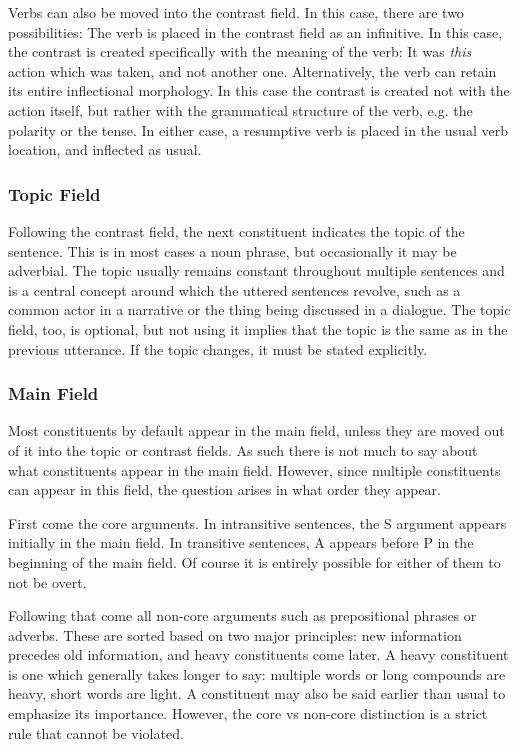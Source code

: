 \documentclass[paper=6in:9in, fontsize=10.5]{scrbook}
\newcommand{\mes}[1]{\hspace{0pt}{\color{teal}#1}}
\newcommand{\rs}{ȿ}
\newcommand{\rz}{ɀ}
\newcommand{\ý}{ɨ́}
\begin{document}
{Verbs can also be moved into the contrast field. In this case, there are two possibilities: The verb is placed in the contrast field as an infinitive. In this case, the contrast is created specifically with the meaning of the verb: It was \emph{this} action which was taken, and not another one. Alternatively, the verb can retain its entire inflectional morphology. In this case the contrast is created not with the action itself, but rather with the grammatical structure of the verb, e.g. the polarity or the tense. In either case, a resumptive verb \mes{\rs{}o\rz{}-} is placed in the usual verb location, and inflected as usual.

\subsubsection{Topic Field}
Following the contrast field, the next constituent indicates the topic of the sentence. This is in most cases a noun phrase, but occasionally it may be adverbial. The topic usually remains constant throughout multiple sentences and is a central concept around which the uttered sentences revolve, such as a common actor in a narrative or the thing being discussed in a dialogue. The topic field, too, is optional, but not using it implies that the topic is the same as in the previous utterance. If the topic changes, it must be stated explicitly. 

\subsubsection{Main Field}
Most constituents by default appear in the main field, unless they are moved out of it into the topic or contrast fields. As such there is not much to say about what constituents appear in the main field. However, since multiple constituents can appear in this field, the question arises in what order they appear.

First come the core arguments. In intransitive sentences, the S argument appears initially in the main field. In transitive sentences, A appears before P in the beginning of the main field. Of course it is entirely possible for either of them to not be overt.

Following that come all non-core arguments such as prepositional phrases or adverbs. These are sorted based on two major principles: new information precedes old information, and heavy constituents come later. A heavy constituent is one which generally takes longer to say: multiple words or long compounds are heavy, short words are light. A constituent may also be said earlier than usual to emphasize its importance. However, the core vs non-core distinction is a strict rule that cannot be violated.

}
\end{document}

